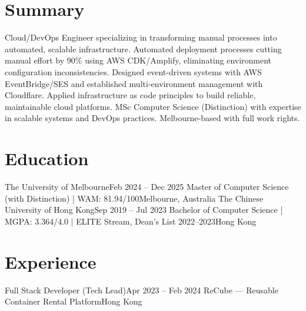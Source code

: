 \documentclass[letterpaper,11pt]{article}
\begin{document}
\makecvheader

\section{Summary}
\small{
Cloud/DevOps Engineer specializing in transforming manual processes into automated, scalable infrastructure. Automated deployment processes cutting manual effort by 90\% using AWS CDK/Amplify, eliminating environment configuration inconsistencies. Designed event-driven systems with AWS EventBridge/SES and established multi-environment management with Cloudflare. Applied infrastructure as code principles to build reliable, maintainable cloud platforms. MSc Computer Science (Distinction) with expertise in scalable systems and DevOps practices. Melbourne-based with full work rights.
}

\section{Education}
  \resumeSubHeadingListStart
    \resumeSubheading
      {The University of Melbourne}{Feb 2024 -- Dec 2025}
      {Master of Computer Science (with Distinction) | WAM: 81.94/100}{Melbourne, Australia}
    \resumeSubheading
      {The Chinese University of Hong Kong}{Sep 2019 -- Jul 2023}
      {Bachelor of Computer Science | MGPA: 3.364/4.0 | ELITE Stream, Dean's List 2022--2023}{Hong Kong}
  \resumeSubHeadingListEnd

\section{Experience}
  \resumeSubHeadingListStart
    \resumeSubheading
      {Full Stack Developer (Tech Lead)}{Apr 2023 -- Feb 2024}
      {ReCube — Reusable Container Rental Platform}{Hong Kong}
      \resumeItemListStart
      \resumeItemListEnd
  \resumeSubHeadingListEnd
\end{document}
